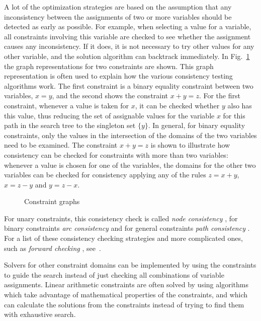A lot of the optimization strategies are based on the assumption that
any inconsistency between the assignments of two or more variables
should be detected as early as possible.  For example, when selecting
a value for a variable, all constraints involving this variable are
checked to see whether the assignment causes any inconsistency.  If it
does, it is not necessary to try other values for any other variable,
and the solution algorithm can backtrack immediately.  In
Fig.~\ref{pic:binary-constraint} the graph representations%
 for two constraints are shown.  This
graph representation is often used to explain how the various
consistency testing algorithms work.  The first constraint is a binary
equality constraint between two variables, $x = y$, and the second
shows the constraint $x+y=z$.  For the first constraint, whenever a
value is taken for $x$, it can be checked whether $y$ also has this
value, thus reducing the set of assignable values for the variable $x$
for this path in the search tree to the singleton set $\{y\}$.  In
general, for binary equality constraints, only the values in the
intersection of the domains of the two variables need to be examined.
The constraint $x+y=z$ is shown to illustrate how consistency can be
checked for constraints with more than two variables: whenever a value
is chosen for one of the variables, the domains for the other two
variables can be checked for consistency applying any of the rules
$z=x+y$, $x=z-y$ and $y=z-x$.

\begin{figure}[htp]
\begin{center}

\end{center}
\caption{Constraint graphs}
\label{pic:binary-constraint}
\end{figure}

For unary constraints, this consistency check is called {\em node consistency}%
%
, for binary constraints {\em arc consistency}%
%
 and for general constraints {\em path
  consistency}%
%
.  For a list of these consistency checking strategies
and more complicated ones, such as {\em forward checking}%
,
see~\cite{marriot98programmingwithconstraints}.

Solvers for other constraint domains can be implemented by using the
constraints to guide the search instead of just checking all
combinations of variable assignments.  Linear arithmetic constraints
are often solved by using algorithms which take advantage of
mathematical properties of the constraints, and which can calculate
the solutions from the constraints instead of trying to find them with
exhaustive search.

